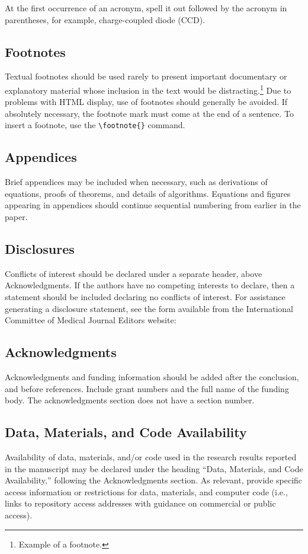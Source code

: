 \documentclass[12pt]{spieman}  %
\begin{document}
\begin{spacing}{2}
At the first occurrence of an acronym, spell it out followed by the acronym in parentheses, for example, charge-coupled diode (CCD).

\subsection{Footnotes}
Textual footnotes should be used rarely to present important documentary or explanatory material whose inclusion in the text would be distracting.\footnote{Example of a footnote.} Due to problems with HTML display, use of footnotes should generally be avoided. If absolutely necessary, the footnote mark must come at the end of a sentence. To insert a footnote, use the {\verb|\footnote{}|} command.

\subsection{Appendices}
Brief appendices may be included when necessary, such as derivations of equations, proofs of theorems, and details of algorithms. Equations and figures appearing in appendices should continue sequential numbering from earlier in the paper.

\subsection{Disclosures}
Conflicts of interest should be declared under a separate header, above Acknowledgments. If the authors have no competing interests to declare, then a statement should be included declaring no conflicts of interest. For assistance generating a disclosure statement, see the form available from  the International Committee of Medical Journal Editors website: 

\subsection{Acknowledgments}
Acknowledgments and funding information should be added after the conclusion, and before references. Include grant numbers and the full name of the funding body. The acknowledgments section does not have a section number.

\subsection{Data, Materials, and Code Availability}
Availability of data, materials, and/or code used in the research results reported in the manuscript may be declared under the heading ``Data, Materials, and Code Availability,'' following the Acknowledgments section. As relevant, provide specific access information or restrictions for data, materials, and computer code (i.e., links to repository access addresses with guidance on commercial or public access).


\end{spacing}
\end{document}
